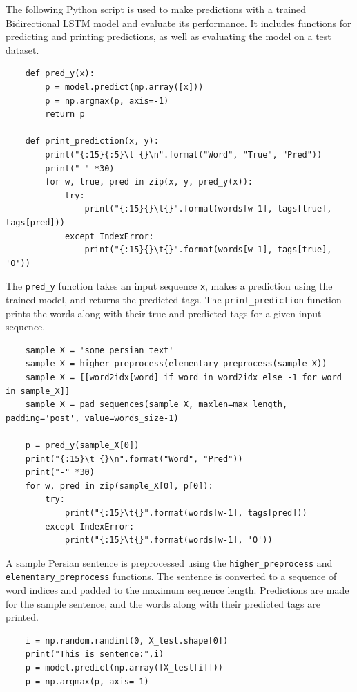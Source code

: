 \documentclass{solutionclass} %
\begin{document}
\begin{solution}

    The following Python script is used to make predictions with a trained Bidirectional LSTM model and evaluate its performance. It includes functions for predicting and printing predictions, as well as evaluating the model on a test dataset.

    \begin{lstlisting}
    def pred_y(x):
        p = model.predict(np.array([x]))
        p = np.argmax(p, axis=-1)
        return p
    
    def print_prediction(x, y):
        print("{:15}{:5}\t {}\n".format("Word", "True", "Pred"))
        print("-" *30)
        for w, true, pred in zip(x, y, pred_y(x)):
            try:
                print("{:15}{}\t{}".format(words[w-1], tags[true], tags[pred]))
            except IndexError:
                print("{:15}{}\t{}".format(words[w-1], tags[true], 'O'))
    \end{lstlisting}
    
    The \texttt{pred\_y} function takes an input sequence \texttt{x}, makes a prediction using the trained model, and returns the predicted tags. The \texttt{print\_prediction} function prints the words along with their true and predicted tags for a given input sequence.
    
    \begin{lstlisting}
    sample_X = 'some persian text'
    sample_X = higher_preprocess(elementary_preprocess(sample_X))
    sample_X = [[word2idx[word] if word in word2idx else -1 for word in sample_X]]
    sample_X = pad_sequences(sample_X, maxlen=max_length, padding='post', value=words_size-1)
    
    p = pred_y(sample_X[0])
    print("{:15}\t {}\n".format("Word", "Pred"))
    print("-" *30)
    for w, pred in zip(sample_X[0], p[0]):
        try:
            print("{:15}\t{}".format(words[w-1], tags[pred]))
        except IndexError:
            print("{:15}\t{}".format(words[w-1], 'O'))
    \end{lstlisting}
    
    A sample Persian sentence is preprocessed using the \texttt{higher\_preprocess} and \texttt{elementary\_preprocess} functions. The sentence is converted to a sequence of word indices and padded to the maximum sequence length. Predictions are made for the sample sentence, and the words along with their predicted tags are printed.
    
    \begin{lstlisting}
    i = np.random.randint(0, X_test.shape[0])
    print("This is sentence:",i)
    p = model.predict(np.array([X_test[i]]))
    p = np.argmax(p, axis=-1)
    

\end{lstlisting}
\end{solution}
\end{document}

